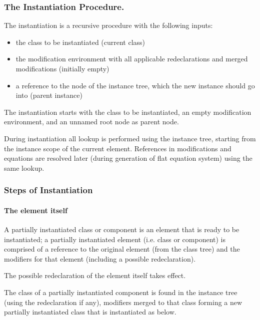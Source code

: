 \documentclass[10pt,a4paper]{report}
\def\doublelabel#1{\label{#1}\hypertarget{#1}{}}
\begin{document}
\subsubsection{The Instantiation Procedure.}\doublelabel{the-instantiation-procedure}

The instantiation is a recursive procedure with the following inputs:

\begin{itemize}
\item
  the class to be instantiated (current class)
\item
  the modification environment with all applicable redeclarations and
  merged modifications (initially empty)
\item
  a reference to the node of the instance tree, which the new instance
  should go into (parent instance)
\end{itemize}

The instantiation starts with the class to be instantiated, an empty
modification environment, and an unnamed root node as parent node.

During instantiation all lookup is performed using the instance tree,
starting from the instance scope of the current element. References in
modifications and equations are resolved later (during generation of
flat equation system) using the same lookup.

\subsubsection{Steps of Instantiation}\doublelabel{steps-of-instantiation}

\paragraph{The element itself}\doublelabel{the-element-itself}

A partially instantiated class or component is an element that is ready
to be instantiated; a partially instantiated element (i.e. class or
component) is comprised of a reference to the original element (from the
class tree) and the modifiers for that element (including a possible
redeclaration).

The possible redeclaration of the element itself takes effect.

The class of a partially instantiated component is found in the instance
tree (using the redeclaration if any), modifiers merged to that class
forming a new partially instantiated class that is instantiated as
below.
\end{document}
